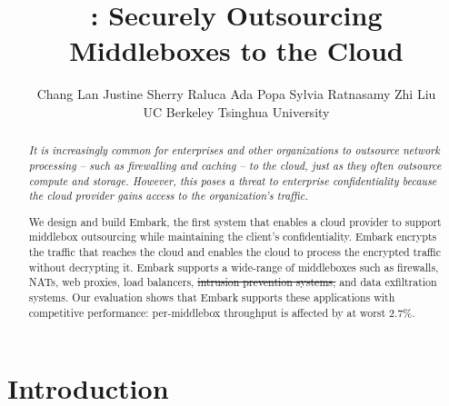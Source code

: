 \documentclass[letterpaper,twocolumn,10pt]{article}
\date{}
\title{
  \sys: Securely Outsourcing Middleboxes to the Cloud
}
\author{
  {\rm Chang Lan} \qquad 
  {\rm Justine Sherry} \qquad 
  {\rm Raluca Ada Popa} \qquad 
  {\rm Sylvia Ratnasamy} \qquad 
  {\rm Zhi Liu\affila} \\
  UC Berkeley \qquad \affila Tsinghua University
}
\newcommand{\sys}{Embark\xspace} %
\newcommand{\todo}[1]{{\color{Red}{\bf }}} %
\providecommand{\DIFdeltex}[1]{{\protect\color{red}\sout{#1}}}                      %
\providecommand{\DIFdelbegin}{} %
\providecommand{\DIFdelend}{} %
\providecommand{\DIFdel}[1]{\texorpdfstring{\DIFdeltex{#1}}{}} %
\begin{document}
\maketitle


\begin{abstract}
\todo{if we are under space limit, you can move this down a bit as it is quite squeezed}
{\it %
It is increasingly common for enterprises and other organizations to outsource network processing -- such as firewalling and caching -- to the cloud, just as they often outsource compute and storage.
However, this poses a threat to enterprise confidentiality because the cloud provider gains access to the organization's traffic.

We design and build \sys, the first system that enables a cloud provider to support middlebox outsourcing while maintaining the client's confidentiality. \sys encrypts the traffic that reaches the cloud and enables the cloud to process the  encrypted traffic {without decrypting it}.
\sys supports a wide-range of middleboxes such as firewalls, NATs, web proxies, load balancers,  \DIFdelbegin \DIFdel{intrusion prevention systems, }\DIFdelend and data exfiltration systems. Our evaluation shows that \sys supports these applications with competitive performance: per-middlebox throughput is affected by at worst 2.7\%.
}
\end{abstract}



\section{Introduction}\label{sec:intro}
\end{document}
